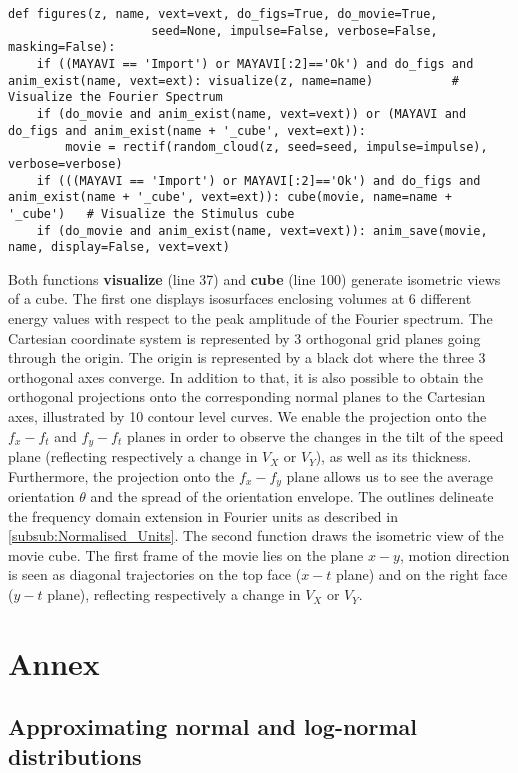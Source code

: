 \documentclass[a4paper,11pt]{article}%
\begin{document}
\begin{lstlisting}
def figures(z, name, vext=vext, do_figs=True, do_movie=True,
                    seed=None, impulse=False, verbose=False, masking=False):
    if ((MAYAVI == 'Import') or MAYAVI[:2]=='Ok') and do_figs and anim_exist(name, vext=ext): visualize(z, name=name)           # Visualize the Fourier Spectrum
    if (do_movie and anim_exist(name, vext=vext)) or (MAYAVI and do_figs and anim_exist(name + '_cube', vext=ext)):
        movie = rectif(random_cloud(z, seed=seed, impulse=impulse), verbose=verbose)
    if (((MAYAVI == 'Import') or MAYAVI[:2]=='Ok') and do_figs and anim_exist(name + '_cube', vext=ext)): cube(movie, name=name + '_cube')   # Visualize the Stimulus cube
    if (do_movie and anim_exist(name, vext=vext)): anim_save(movie, name, display=False, vext=vext)
\end{lstlisting}


Both functions \textbf{visualize} (line 37) and \textbf{cube} (line 100) generate isometric views of a cube. The first one displays isosurfaces enclosing volumes at 6 different energy values with respect to the peak amplitude of the Fourier spectrum. The Cartesian coordinate system is represented by 3 orthogonal grid planes going through the origin. The origin is represented by a black dot where the three 3 orthogonal axes converge. In addition to that, it is also possible to obtain the orthogonal projections onto the corresponding normal planes to the Cartesian axes, illustrated by 10 contour level curves. We enable the projection onto the $f_x-f_t$ and $f_y-f_t$ planes in order to observe the changes in the tilt of the speed plane (reflecting respectively a change in $V_X$ or $V_Y$), as well as its thickness. Furthermore, the projection onto the $f_x-f_y$ plane allows us to see the average orientation $\theta$ and the spread of the orientation envelope. The outlines delineate the frequency domain extension in Fourier units as described in \ref{subsub:Normalised_Units}. The second function draws the isometric view of the movie cube. The first frame of the movie lies on the plane $x-y$, motion direction is seen as diagonal trajectories on the top face ($x-t$ plane) and on the right face ($y-t$ plane), reflecting respectively a change in $V_X$ or $V_Y$. %
% 
%

\appendix
\section{Annex}
\subsection{Approximating normal and log-normal distributions}
\label{appendix:Approximating distributions}
\end{document}
